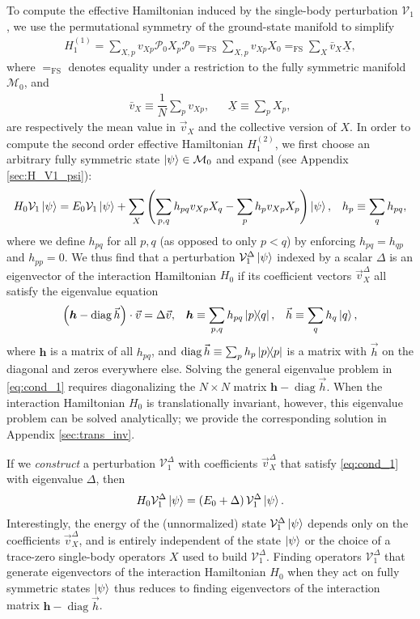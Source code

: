 \documentclass[nofootinbib,notitlepage,11pt]{revtex4-2}
\newcommand{\f}[2]{\dfrac{#1}{#2}} %
\newcommand{\p}[1]{\left(#1\right)} %
\renewcommand{\c}{\cdot} %
\newcommand{\m}{\bm} %
\renewcommand{\v}{\vec} %
\newcommand{\1}{\mathds{1}}
\newcommand{\M}{\mathcal{M}}
\renewcommand{\P}{\mathcal{P}}
\newcommand{\V}{\mathcal{V}}
\newcommand{\EQFS}{=_{\text{FS}}}
\newcommand{\col}{\underline}
\DeclareMathOperator{\diag}{diag}
\begin{document}
To compute the effective Hamiltonian induced by the single-body
perturbation $\V_1$, we use the permutational symmetry of the
ground-state manifold to simplify
\begin{align}
  H_1^{(1)} = \sum_{X,p} v_{Xp} \P_0 X_p \P_0
  \EQFS \sum_{X,p} v_{Xp} X_0
  \EQFS \sum_X \bar v_X \col{X},
  \label{eq:H_1_1}
\end{align}
where $\EQFS$ denotes equality under a restriction to the fully
symmetric manifold $\M_0$, and
\begin{align}
  \bar v_X \equiv \f1N \sum_p v_{Xp},
  &&
  \col{X} \equiv \sum_p X_p,
\end{align}
are respectively the mean value in $\v v_X$ and the collective version
of $X$.  In order to compute the second order effective Hamiltonian
$H_1^{(2)}$, we first choose an arbitrary fully symmetric state
$\ket\psi\in\M_0$ and expand (see Appendix \ref{sec:H_V1_psi}):
\begin{align}
  H_0 \V_1 \ket\psi
  = E_0 \V_1 \ket\psi
  + \sum_X \p{\sum_{p,q} h_{pq} v_{Xp} X_q - \sum_p h_p v_{Xp} X_p}
  \ket\psi,
  &&
  h_p \equiv \sum_q h_{pq},
  \label{eq:H_V1_psi}
\end{align}
where we define $h_{pq}$ for all $p,q$ (as opposed to only $p<q$) by
enforcing $h_{pq}=h_{qp}$ and $h_{pp}=0$.  We thus find that a
perturbation $\V_1^\Delta\ket\psi$ indexed by a scalar $\Delta$ is an
eigenvector of the interaction Hamiltonian $H_0$ if its coefficient
vectors $\v v_X^\Delta$ all satisfy the eigenvalue equation
\begin{align}
  \p{\m h - \diag\v h}\c\v v = \Delta \v v,
  &&
  \m h \equiv \sum_{p,q} h_{pq} \op{p}{q},
  &&
  \v h \equiv \sum_q h_q \ket{q},
  \label{eq:cond_1}
\end{align}
where $\m h$ is a matrix of all $h_{pq}$, and
$\diag\v h\equiv\sum_p h_p \op{p}$ is a matrix with $\v h$ on the
diagonal and zeros everywhere else.  Solving the general eigenvalue
problem in \eqref{eq:cond_1} requires diagonalizing the $N\times N$
matrix $\m h-\diag\v h$.  When the interaction Hamiltonian $H_0$ is
translationally invariant, however, this eigenvalue problem can be
solved analytically; we provide the corresponding solution in Appendix
\ref{sec:trans_inv}.

If we {\it construct} a perturbation $\V_1^\Delta$ with coefficients
$\v v_X^\Delta$ that satisfy \eqref{eq:cond_1} with eigenvalue
$\Delta$, then
\begin{align}
  H_0 \V_1^\Delta \ket\psi = \p{E_0 + \Delta} \V_1^\Delta \ket\psi.
\end{align}
Interestingly, the energy of the (unnormalized) state
$\V_1^\Delta\ket\psi$ depends only on the coefficients
$\v v_X^\Delta$, and is entirely independent of the state $\ket\psi$
or the choice of a trace-zero single-body operators $X$ used to build
$\V_1^\Delta$.  Finding operators $\V_1^\Delta$ that generate
eigenvectors of the interaction Hamiltonian $H_0$ when they act on
fully symmetric states $\ket\psi$ thus reduces to finding eigenvectors
of the interaction matrix $\m h-\diag\v h$.
\end{document}
